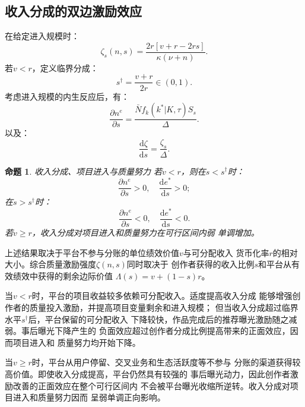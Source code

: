 \documentclass[UTF8, a4paper, 12pt, fontset=fandol]{ctexart}
\newtheorem{proposition}[theorem]{命题}
\theoremstyle{definition}
\theoremstyle{remark}
\begin{document}
\subsection{收入分成的双边激励效应}
在给定进入规模时：
\begin{equation*}
  \zeta_s(n,s) = \frac{2r[v+r-2rs]}{\kappa(\nu+n)}.
\end{equation*}
若$v<r$，定义临界分成：
\begin{equation*}
  s^\dagger = \frac{v+r}{2r}\in (0,1).
\end{equation*}
考虑进入规模的内生反应后，有：
\begin{equation*}
  \frac{\partial n^e}{\partial s}=
  \frac{\bar{N}f_k(k^*|K,\tau)S_s}{\Delta}.
\end{equation*}
以及：
\begin{equation*}
  \frac{\mathrm{d}\zeta}{\mathrm{d}s} = \frac{\zeta_s}{\Delta}.
\end{equation*}
\begin{proposition}{收入分成、项目进入与质量努力}
  若$v < r$，则在$s<s^\dagger$时：
  \begin{equation*}
    \frac{\partial n^e}{\partial s}>0,
    \quad
    \frac{\mathrm{d}e^*}{\mathrm{d}s}>0;
  \end{equation*}
  在$s > s^\dagger$时：
  \begin{equation*}
    \frac{\partial n^e}{\partial s}<0,\quad
    \frac{\mathrm{d}e^*}{\mathrm{d}s}<0.
  \end{equation*}
  若$v \ge r$，收入分成对项目进入和质量努力在可行区间内弱
  单调增加。
\end{proposition}
上述结果取决于平台不参与分账的单位绩效价值$v$与可分配收入
货币化率$r$的相对大小。综合质量激励强度$\zeta(n,s)$同时取决于
创作者获得的收入比例$s$和平台从有效绩效中获得的剩余边际价值
$\Lambda(s)=v+(1-s)r$。

当$v<r$时，平台的项目收益较多依赖可分配收入。适度提高收入分成
能够增强创作者的质量投入激励，并提高项目变量剩余和进入规模；
但当收入分成超过临界水平$s^\dagger$后，平台保留的可分配收入
下降较快，作品完成后的推荐曝光激励随之减弱。事后曝光下降产生的
负面效应超过创作者分成比例提高带来的正面效应，因而项目进入和
质量努力均开始下降。

当$v\geq r$时，平台从用户停留、交叉业务和生态活跃度等不参与
分账的渠道获得较高价值。即使收入分成提高，平台仍然具有较强的
事后曝光动力，因此创作者激励改善的正面效应在整个可行区间内
不会被平台曝光收缩所逆转。收入分成对项目进入和质量努力因而
呈弱单调正向影响。
\end{document}
